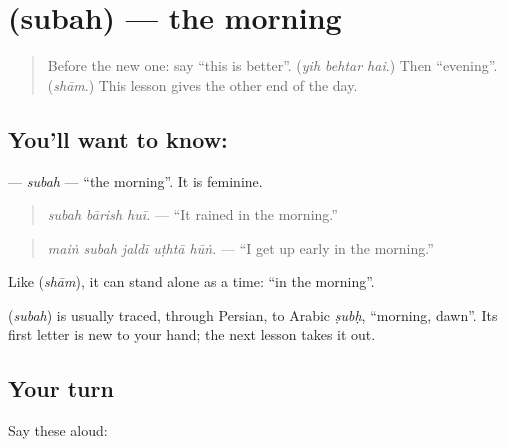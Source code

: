 \section[\texorpdfstring{\ur{صبح} (subah)}{صبح (subah)}]{ (subah) — the morning}

\label{lesson:UR-C273-subah}



\begin{quote}
Before the new one: say \textquotedblleft{}this is better\textquotedblright{}. (\emph{yih behtar hai}.) Then \textquotedblleft{}evening\textquotedblright{}. (\emph{shām}.) This lesson gives the other end of the day.
\end{quote}

\subsection*{You'll want to know: }
\textbf{} — \emph{subah} — \textquotedblleft{}the morning\textquotedblright{}. It is feminine.

\begin{quote}
\textbf{  }
\end{quote}

\begin{quote}
\emph{subah bārish huī.} — \textquotedblleft{}It rained in the morning.\textquotedblright{}
\end{quote}

\begin{quote}
\textbf{    }
\end{quote}

\begin{quote}
\emph{maiṅ subah jaldī uṭhtā hūṅ.} — \textquotedblleft{}I get up early in the morning.\textquotedblright{}
\end{quote}

Like \textbf{} (\emph{shām}), it can stand alone as a time: \textquotedblleft{}in the morning\textquotedblright{}.

\begin{cousinweb}
\textbf{} (\emph{subah}) is usually traced, through Persian, to Arabic \emph{ṣubḥ}, \textquotedblleft{}morning, dawn\textquotedblright{}. Its first letter is new to your hand; the next lesson takes it out.
\end{cousinweb}

\subsection*{Your turn}
Say these aloud:

